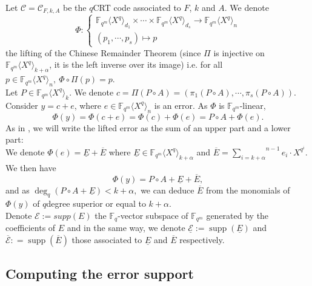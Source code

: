\documentclass{article}
\newcommand{\QP}{\mathbb{F}_{q^m} \langle X^q \rangle}
\newcommand{\supp}{\operatorname{supp}}
\theoremstyle{definition}
\begin{document}
\noindent Let $\mathcal{C}=\mathcal{C}_{F, k,A}$ be the $q$CRT code associated
to $F$, $k$ and $A$.
We denote
$$\Phi : \left\{\begin{array}{l}
            \mathbb{F}_{q^m} \langle X^q \rangle_{d_1} \times \cdots \times
            \mathbb{F}_{q^m} \langle X^q \rangle_{d_s} \longrightarrow \mathbb{F}_{q^m}
            \langle X^q \rangle_{n} \\
            (p_1, \cdots, p_s) \longmapsto p
      \end{array}\right.$$ the lifting of the Chinese Remainder Theorem (since $\Pi$ is injective on $\mathbb{F}_{q^m} \langle X^q \rangle_{k+\alpha}$, it is the left inverse over its image) i.e. for all $p \in \mathbb{F}_{q^m} \langle X^q \rangle_{n},~ \Phi \circ \Pi(p) = p. $\\
Let $P \in \mathbb{F}_{q^m} \langle X^q \rangle_{k}$.
We denote $c= \Pi (P \circ A) = (\pi_1 (P \circ A), \cdots,
      \pi_s (P\circ A))$. Consider $y=c+e$, where
$e \in \QP_n$ is an error.
As $\Phi $ is $\mathbb{F}_{q^m}$-linear, \[ \Phi (y)
      = \Phi (c+e) = \Phi (c) + \Phi
      (e) = P \circ A + \Phi(e). \]
As in \cite{yu_polynomial_2012}, we will write the lifted error as the sum of an upper part and a lower part:\\
\color{black}
We denote $\Phi
      (e) = \underline{E} + \overline{E}$ where $\underline{E} \in
      \mathbb{F}_{q^m} \langle X^q \rangle_{k+\alpha}$ and $\overline{E} =
      \underset{}{\overset{n - 1}{\underset{i =k+ \alpha}{\sum}} e_i \cdot X^{q^i}}$.
We then have
\begin{equation} \label{remontee}
      \Phi(y) =  P \circ A + \underline{E} + \overline{E},
\end{equation}
and as $\deg_q( P \circ A + \underline{E})<k+ \alpha,$ we can deduce $\overline{E}$ from the monomials of $\Phi(y)$ of $q$degree superior or equal to $k+\alpha$. \\

\noindent Denote $\mathcal{E}:=  supp( E )$ the $\mathbb{F}_q$-vector subspace of
$\mathbb{F}_{q^m}$ generated by the coefficients of $E$ and in the same way,
we denote $\underline{\mathcal{E}} := \supp( \underline{E} )$
and $\overline{\mathcal{E}}: = \supp( \overline{E} )$ those
associated to $\underline{E}$ and $\overline{E}$ respectively.

\subsection{Computing the error support } \label{section_Computing_the_error_support}
\end{document}

